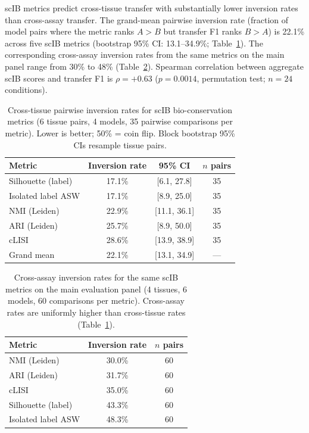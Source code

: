 \documentclass[11pt]{article}
\begin{document}
scIB metrics predict cross-tissue transfer with substantially lower
inversion rates than cross-assay transfer. The grand-mean pairwise
inversion rate (fraction of model pairs where the metric ranks
$A > B$ but transfer F1 ranks $B > A$) is 22.1\% across five scIB
metrics (bootstrap 95\% CI: 13.1--34.9\%;
Table~\ref{tab:crosstissue}). The corresponding cross-assay inversion
rates from the same metrics on the main panel range from 30\% to 48\%
(Table~\ref{tab:crossassay_inv}). Spearman correlation between
aggregate scIB scores and transfer F1 is $\rho = +0.63$ ($p = 0.0014$,
permutation test; $n = 24$ conditions).

\medskip
\begin{table}[t]
\centering
\caption{Cross-tissue pairwise inversion rates for scIB
bio-conservation metrics (6 tissue pairs, 4 models, 35 pairwise
comparisons per metric). Lower is better; 50\% = coin flip. Block
bootstrap 95\% CIs resample tissue pairs.}
\label{tab:crosstissue}
\small
\begin{tabular}{@{}lccc@{}}
\toprule
Metric & Inversion rate & 95\% CI & $n$ pairs \\
\midrule
Silhouette (label)   & 17.1\% & [6.1, 27.8] & 35 \\
Isolated label ASW   & 17.1\% & [8.9, 25.0] & 35 \\
NMI (Leiden)         & 22.9\% & [11.1, 36.1] & 35 \\
ARI (Leiden)         & 25.7\% & [8.9, 50.0] & 35 \\
cLISI                & 28.6\% & [13.9, 38.9] & 35 \\
\midrule
Grand mean           & 22.1\% & [13.1, 34.9] & --- \\
\bottomrule
\end{tabular}
\end{table}

\medskip
\begin{table}[t]
\centering
\caption{Cross-assay inversion rates for the same scIB metrics on the
main evaluation panel (4 tissues, 6 models, 60 comparisons per metric).
Cross-assay rates are uniformly higher than cross-tissue rates
(Table~\ref{tab:crosstissue}).}
\label{tab:crossassay_inv}
\small
\begin{tabular}{@{}lcc@{}}
\toprule
Metric & Inversion rate & $n$ pairs \\
\midrule
NMI (Leiden)         & 30.0\% & 60 \\
ARI (Leiden)         & 31.7\% & 60 \\
cLISI                & 35.0\% & 60 \\
Silhouette (label)   & 43.3\% & 60 \\
Isolated label ASW   & 48.3\% & 60 \\
\bottomrule
\end{tabular}
\end{table}
\end{document}
